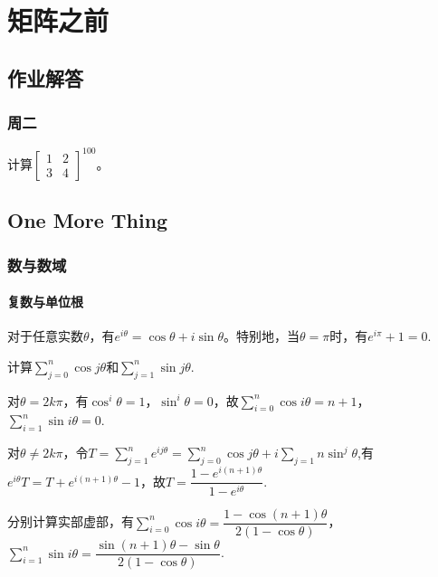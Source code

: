 \chapter{矩阵之前}

    \section{作业解答}

    \subsection{周二}

        \begin{homework}[P114 T514]
            计算$\begin{bmatrix} 1 & 2 \\ 3 & 4 \end{bmatrix}^{100}$。
        \end{homework}

    \section{One More Thing}

        \subsection{数与数域}

            \subsubsection{复数与单位根}

                \begin{theorem}[Euler]
                    对于任意实数$\theta$，有$e^{i\theta}=\cos\theta+i\sin\theta$。特别地，当$\theta=\pi$时，有$e^{i\pi}+1=0$.
                \end{theorem}

                \begin{example}
                    计算$\sum\limits_{j=0}^n\cos j\theta$和$\sum\limits_{j=1}^n\sin j\theta$.
                \end{example}

                \begin{solution}
                    对$\theta =2k\pi$，有$\cos^{i}\theta = 1$，$\sin^{i}\theta = 0$，故$\sum\limits_{i=0}^n\cos i\theta = n+1$，$\sum\limits_{i=1}^n\sin i\theta = 0$.

                    对$\theta \neq 2k\pi$，令$T=\sum\limits_{j=1}^{n}e^{ij\theta}=\sum\limits_{j=0}^n\cos j\theta+i\sum\limits_{j=1} n\sin^{j}\theta$,有$e^{i\theta}T=T+e^{i(n+1)\theta}-1$，故$T=\dfrac{1-e^{i(n+1)\theta}}{1-e^{i\theta}}$.

                    分别计算实部虚部，有$\sum\limits_{i=0}^n\cos i\theta = \dfrac{1-\cos(n+1)\theta}{2(1-\cos\theta)}$，$\sum\limits_{i=1}^n\sin i\theta = \dfrac{\sin (n+1)\theta-\sin \theta}{2(1-\cos\theta)}$.
                \end{solution}

